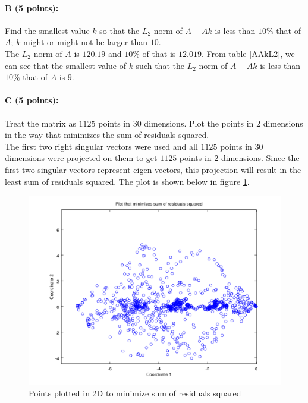 \documentclass[11pt]{article}
\begin{document}
\paragraph{B (5 points):}
Find the smallest value $k$ so that the $L_2$ norm of $A-Ak$ is less than $10\%$ that of $A$; $k$ might or might not be larger than $10$.\\

The $L_2$ norm of $A$ is $120.19$ and $10\%$ of that is $12.019$. From table \ref{AAkL2}, we can see that the smallest value of $k$ such that the $L_2$ norm of $A-Ak$ is less than $10\%$ that of $A$ is $9$.

\paragraph{C (5 points):}

Treat the matrix as $1125$ points in $30$ dimensions. Plot the points in $2$ dimensions in the way that minimizes the sum of residuals squared.\\

The first two right singular vectors were used and all $1125$ points in $30$ dimensions were projected on them to get $1125$ points in $2$ dimensions. Since the first two singular vectors represent eigen vectors, this projection will result in the least sum of residuals squared. The plot is shown below in figure \ref{MinRes}.

\begin{figure}[!htb]
\centering
\includegraphics[width=5in]{figures/MinRes.png}
\caption{Points plotted in 2D to minimize sum of residuals squared}
\label{MinRes}
\end{figure} 
\end{document}
